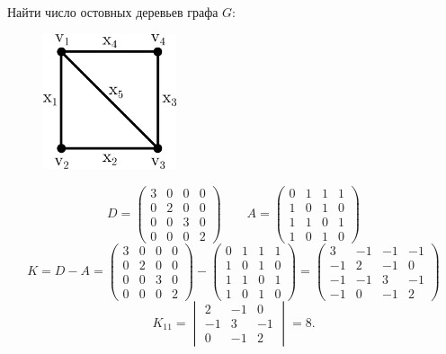 \begin{example*}
    Найти число остовных деревьев графа \(G\):

    \begin{figure}[H]
        \centering
        \includegraphics[width=0.35\textwidth]{images/spanning-tree-count.png}
    \end{figure}

    \[
        D =
        \begin{pmatrix}
            3 & 0 & 0 & 0 \\
            0 & 2 & 0 & 0 \\
            0 & 0 & 3 & 0 \\
            0 & 0 & 0 & 2
        \end{pmatrix}
        \qquad
        A =
        \begin{pmatrix}
            0 & 1 & 1 & 1 \\
            1 & 0 & 1 & 0 \\
            1 & 1 & 0 & 1 \\
            1 & 0 & 1 & 0
        \end{pmatrix}
    \]
    \[
        K = D - A =
        \begin{pmatrix}
            3 & 0 & 0 & 0 \\
            0 & 2 & 0 & 0 \\
            0 & 0 & 3 & 0 \\
            0 & 0 & 0 & 2
        \end{pmatrix}
        -
        \begin{pmatrix}
            0 & 1 & 1 & 1 \\
            1 & 0 & 1 & 0 \\
            1 & 1 & 0 & 1 \\
            1 & 0 & 1 & 0
        \end{pmatrix}
        =
        \begin{pmatrix}
            3  & -1 & -1 & -1 \\
            -1 & 2  & -1 & 0  \\
            -1 & -1 & 3  & -1 \\
            -1 & 0  & -1 & 2
        \end{pmatrix}
    \]
    \[
        K_{11} =
        \begin{vmatrix}
            2  & -1 & 0  \\
            -1 & 3  & -1 \\
            0  & -1 & 2
        \end{vmatrix}
        = 8.
    \]
\end{example*}

